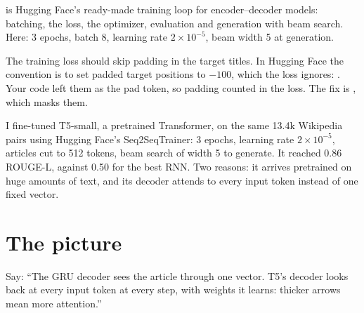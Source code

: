 \begin{definition}
 is Hugging Face's ready-made training loop for encoder--decoder models: batching, the loss, the optimizer, evaluation and generation with beam search. Here: 3 epochs, batch 8, learning rate $2\times10^{-5}$, beam width 5 at generation.
\end{definition}

\begin{definition}
The training loss should skip padding in the target titles. In Hugging Face the convention is to set padded target positions to $-100$, which the loss ignores: . Your code left them as the pad token, so padding counted in the loss. The fix is , which masks them.
\end{definition}

\begin{sayit}
I fine-tuned T5-small, a pretrained Transformer, on the same 13.4k Wikipedia pairs using Hugging Face's Seq2SeqTrainer: 3 epochs, learning rate $2\times10^{-5}$, articles cut to 512 tokens, beam search of width 5 to generate. It reached 0.86 ROUGE-L, against 0.50 for the best RNN. Two reasons: it arrives pretrained on huge amounts of text, and its decoder attends to every input token instead of one fixed vector.
\end{sayit}

\section{The picture}

\begin{sayit}
\begin{pic}
\end{pic}
Say: ``The GRU decoder sees the article through one vector. T5's decoder looks back at every input token at every step, with weights it learns: thicker arrows mean more attention.''
\end{sayit}

